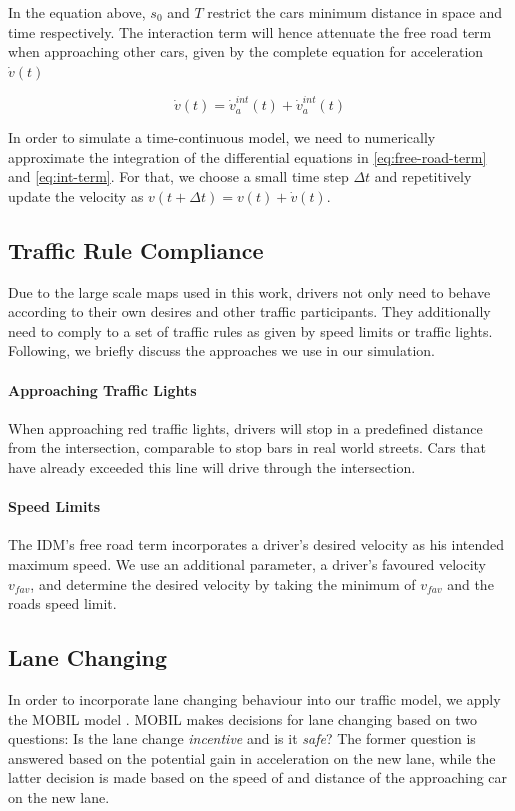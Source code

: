 \documentclass[10pt]{article}
\begin{document}
In the equation above, $s_0$ and $T$ restrict the cars minimum distance in space and time respectively. The interaction term will hence attenuate the free road term when approaching other cars, given by the complete equation for acceleration $\dot{v}(t)$

\begin{equation}
	\dot{v}(t) = \dot{v}_a^{int}(t) + \dot{v}_a^{int}(t)
\end{equation}

In order to simulate a time-continuous model, we need to numerically approximate the integration of the differential equations in \ref{eq:free-road-term} and \ref{eq:int-term}. For that, we choose a small time step $\Delta t$ and repetitively update the velocity as $v(t + \Delta t) = v(t) + \dot{v}(t)$.

\subsection{Traffic Rule Compliance}
Due to the large scale maps used in this work, drivers not only need to behave according to their own desires and other traffic participants. They additionally need to comply to a set of traffic rules as given by speed limits or traffic lights. Following, we briefly discuss the approaches we use in our simulation.

\paragraph{Approaching Traffic Lights} When approaching red traffic lights, drivers will stop in a predefined distance from the intersection, comparable to stop bars in real world streets. Cars that have already exceeded this line will drive through the intersection. 

\paragraph{Speed Limits} The IDM's free road term incorporates a driver's desired velocity as his intended maximum speed. We use an additional parameter, a driver's favoured velocity $v_{fav}$, and determine the desired velocity by taking the minimum of $v_{fav}$ and the roads speed limit.

\subsection{Lane Changing}
In order to incorporate lane changing behaviour into our traffic model, we apply the MOBIL model \citep{treiber2002realistische, kesting2007general}. MOBIL makes decisions for lane changing based on two questions: Is the lane change \textit{incentive} and is it \textit{safe}? The former question is answered based on the potential gain in acceleration on the new lane, while the latter decision is made based on the speed of and distance of the approaching car on the new lane.
\end{document}
